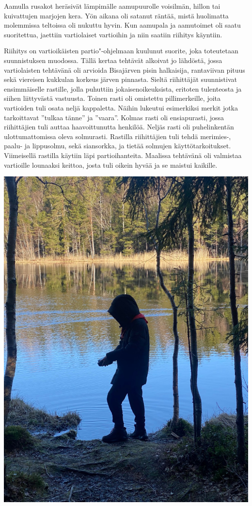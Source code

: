 \begin{multicols}{2}
Aamulla rusakot heräsivät lämpimälle aamupuurolle voisilmän, hillon tai
kuivattujen marjojen kera. Yön aikana oli satanut räntää, mistä huolimatta
molemmissa teltoissa oli nukuttu hyvin. Kun aamupala ja aamutoimet oli saatu
suoritettua, jaettiin vartiolaiset vartioihin ja niin saatiin riihitys
käyntiin.

Riihitys on vartioikäisten partio"-ohjelmaan kuulunut suorite, joka toteutetaan
suunnistuksen muodossa. Tällä kertaa tehtävät alkoivat jo lähdöstä, jossa
vartiolaisten tehtävänä oli arvioida Bisajärven pisin halkaisija, rantaviivan
pituus sekä viereisen kukkulan korkeus järven pinnasta. Sieltä riihittäjät
suunnistivat ensimmäiselle rastille, jolla puhuttiin jokaisenoikeuksista,
eritoten tulenteosta ja siihen liittyvästä vastuusta. Toinen rasti oli
omistettu pillimerkeille, joita vartioiden tuli osata neljä kappaletta. Näihin
lukeutui esimerkiksi merkit jotka tarkoittavat ''tulkaa tänne'' ja ''vaara''.
Kolmas rasti oli ensiapurasti, jossa riihittäjien tuli auttaa haavoittunutta
henkilöä. Neljäs rasti oli puhelinkentän ulottumattomissa oleva solmurasti.
Rastilla riihittäjien tuli tehdä merimies-, paalu- ja lippusolmu, sekä
siansorkka, ja tietää solmujen käyttötarkoitukset. Viimeisellä rastilla käytiin
läpi partioihanteita. Maalissa tehtävänä oli valmistaa vartioille lounaaksi
keittoa, josta tuli oikein hyvää ja se maistui kaikille.

\smallskip
\begin{center}
	\noindent\includegraphics[width=0.9\linewidth]{assets/telttaretki1}
\end{center}


\end{multicols}
